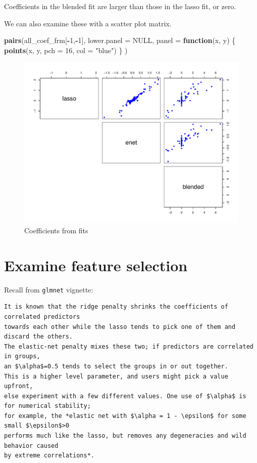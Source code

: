 \documentclass[
]{book}
\newenvironment{Shaded}{\begin{snugshade}}{\end{snugshade}}
\newcommand{\ControlFlowTok}[1]{\textcolor[rgb]{0.13,0.29,0.53}{\textbf{#1}}}
\newcommand{\DataTypeTok}[1]{\textcolor[rgb]{0.13,0.29,0.53}{#1}}
\newcommand{\DecValTok}[1]{\textcolor[rgb]{0.00,0.00,0.81}{#1}}
\newcommand{\KeywordTok}[1]{\textcolor[rgb]{0.13,0.29,0.53}{\textbf{#1}}}
\newcommand{\NormalTok}[1]{#1}
\newcommand{\OperatorTok}[1]{\textcolor[rgb]{0.81,0.36,0.00}{\textbf{#1}}}
\newcommand{\OtherTok}[1]{\textcolor[rgb]{0.56,0.35,0.01}{#1}}
\newcommand{\StringTok}[1]{\textcolor[rgb]{0.31,0.60,0.02}{#1}}
\begin{document}
Coefficients in the blended fit are larger than those in the
lasso fit, or zero.

We can also examine these with a scatter plot matrix.

\begin{Shaded}
\begin{Highlighting}[]
\KeywordTok{pairs}\NormalTok{(all\_coef\_frm[}\OperatorTok{{-}}\DecValTok{1}\NormalTok{,}\OperatorTok{{-}}\DecValTok{1}\NormalTok{],}
  \DataTypeTok{lower.panel =} \OtherTok{NULL}\NormalTok{,}
  \DataTypeTok{panel =} \ControlFlowTok{function}\NormalTok{(x, y) \{}
    \KeywordTok{points}\NormalTok{(x, y, }\DataTypeTok{pch =} \DecValTok{16}\NormalTok{, }\DataTypeTok{col =} \StringTok{"blue"}\NormalTok{)}
\NormalTok{  \}}
\NormalTok{)}
\end{Highlighting}
\end{Shaded}

\begin{figure}
\centering
\includegraphics{Static/figures/pairsCoeffProf-1.pdf}
\caption{\label{fig:pairsCoeffProf}Coefficients from fits}
\end{figure}

\hypertarget{examine-feature-selection}{%
\section{Examine feature selection}\label{examine-feature-selection}}

Recall from \texttt{glmnet} vignette:

\begin{verbatim}
It is known that the ridge penalty shrinks the coefficients of correlated predictors
towards each other while the lasso tends to pick one of them and discard the others.
The elastic-net penalty mixes these two; if predictors are correlated in groups,
an $\alpha$=0.5 tends to select the groups in or out together.
This is a higher level parameter, and users might pick a value upfront,
else experiment with a few different values. One use of $\alpha$ is for numerical stability;
for example, the *elastic net with $\alpha = 1 - \epsilon$ for some small $\epsilon$>0
performs much like the lasso, but removes any degeneracies and wild behavior caused
by extreme correlations*.
\end{verbatim}
\end{document}

